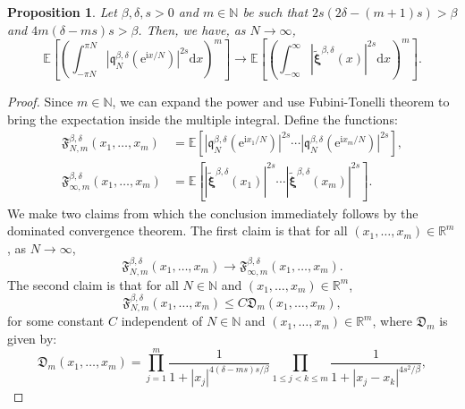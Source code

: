 \documentclass[]{article}
\newtheorem{prop}[thm]{Proposition}
\begin{document}
\begin{prop}\label{PropIntegerMoments}
Let $\beta,\delta,s>0$ and $m \in \mathbb{N}$ be such that $2s(2\delta-(m+1)s)>\beta$ and $4m(\delta-m s)s>\beta$. Then, we have, as $N \to \infty$,
\begin{equation}
\mathbb{E}\left[\left(\int_{-\pi N}^{\pi N}\left|\mathfrak{q}_N^{\beta,\delta}(\mathrm{e}^{\mathrm{i}x/N})\right|^{2s}\mathrm{d}x\right)^m\right]\longrightarrow \mathbb{E}\left[\left(\int_{-\infty}^\infty \left|\tilde{\boldsymbol{\xi}}^{\beta,\delta}(x)\right|^{2s}\mathrm{d}x\right)^m\right].
\end{equation}
\end{prop}

\begin{proof}
Since $m\in \mathbb{N}$, we can expand the power and use Fubini-Tonelli theorem to bring the expectation inside the multiple integral. Define the functions:
\begin{align*}
\mathfrak{F}_{N,m}^{\beta,\delta}(x_1,\dots,x_m)&=\mathbb{E}\left[\left|\mathfrak{q}_N^{\beta,\delta}(\mathrm{e}^{\mathrm{i}x_1/N})\right|^{2s}\cdots \left|\mathfrak{q}_N^{\beta,\delta}(\mathrm{e}^{\mathrm{i}x_m/N})\right|^{2s}\right],\\
\mathfrak{F}_{\infty,m}^{\beta,\delta}(x_1,\dots,x_m)&=\mathbb{E}\left[\left|\tilde{\boldsymbol{\xi}}^{\beta,\delta}(x_1)\right|^{2s}\cdots \left|\tilde{\boldsymbol{\xi}}^{\beta,\delta}(x_m)\right|^{2s}\right].
\end{align*}
We make two claims from which the conclusion immediately follows by the dominated convergence theorem. The first claim is that for all $(x_1,\dots,x_m) \in \mathbb{R}^m$, as $N \to \infty$,
\begin{equation}\label{ConvergenceForDCT}
\mathfrak{F}_{N,m}^{\beta,\delta}(x_1,\dots,x_m) \longrightarrow \mathfrak{F}_{\infty,m}^{\beta,\delta}(x_1,\dots,x_m).
\end{equation}
The second claim is that for all $N \in \mathbb{N}$ and $(x_1,\dots,x_m) \in \mathbb{R}^m$,
\begin{equation}\label{BoundForDCT}
\mathfrak{F}_{N,m}^{\beta,\delta}(x_1,\dots,x_m) \le C \mathfrak{D}_m(x_1,\dots,x_m),
\end{equation}
for some constant $C$ independent of $N\in \mathbb{N}$ and $(x_1,\dots,x_m)\in \mathbb{R}^m$, where $\mathfrak{D}_m$ is given by:
\begin{equation*}
\mathfrak{D}_m(x_1,\dots,x_m)=\prod_{j=1}^{m}\frac{1}{1+|x_j|^{4(\delta-ms)s/\beta}} \prod_{1\le j < k \le m} \frac{1}{1+|x_j-x_k|^{4s^2/\beta}},

\end{equation*}
\end{proof}
\end{document}
